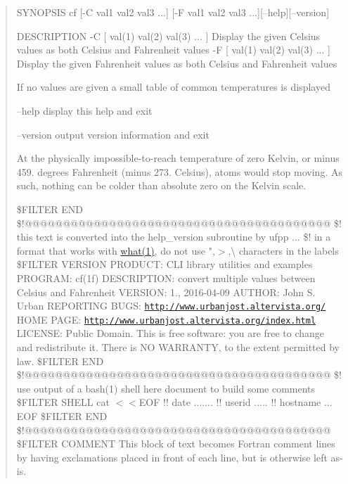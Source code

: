 \begin{quote}
S\+Y\+N\+O\+P\+S\+IS cf \mbox{[}-\/C val1 val2 val3 ...\mbox{]} \mbox{[}-\/F val1 val2 val3 ...\mbox{]}\mbox{[}--help\mbox{]}\mbox{[}--version\mbox{]}

D\+E\+S\+C\+R\+I\+P\+T\+I\+ON -\/C \mbox{[} val(1) val(2) val(3) ... \mbox{]} Display the given Celsius values as both Celsius and Fahrenheit values -\/F \mbox{[} val(1) val(2) val(3) ... \mbox{]} Display the given Fahrenheit values as both Celsius and Fahrenheit values

If no values are given a small table of common temperatures is displayed

--help display this help and exit

--version output version information and exit

At the physically impossible-\/to-\/reach temperature of zero Kelvin, or minus 459. degrees Fahrenheit (minus 273. Celsius), atoms would stop moving. As such, nothing can be colder than absolute zero on the Kelvin scale.

\$\+F\+I\+L\+T\+ER E\+ND \$!@@@@@@@@@@@@@@@@@@@@@@@@@@@@@@@@@@@@@@@@ \$! this text is converted into the help\+\_\+version subroutine by ufpp ... \$! in a format that works with \hyperlink{what__overview_81_8txt_a8cdf8efd1b900d6dce77a3f97edb2216}{what(1)}, do not use ",$>$,\textbackslash{} characters in the labels \$\+F\+I\+L\+T\+ER V\+E\+R\+S\+I\+ON P\+R\+O\+D\+U\+CT\+: C\+LI library utilities and examples P\+R\+O\+G\+R\+AM\+: cf(1f) D\+E\+S\+C\+R\+I\+P\+T\+I\+ON\+: convert multiple values between Celsius and Fahrenheit V\+E\+R\+S\+I\+ON\+: 1., 2016-\/04-\/09 A\+U\+T\+H\+OR\+: John S. Urban R\+E\+P\+O\+R\+T\+I\+NG B\+U\+GS\+: \href{http://www.urbanjost.altervista.org/}{\tt http\+://www.\+urbanjost.\+altervista.\+org/} H\+O\+ME P\+A\+GE\+: \href{http://www.urbanjost.altervista.org/index.html}{\tt http\+://www.\+urbanjost.\+altervista.\+org/index.\+html} L\+I\+C\+E\+N\+SE\+: Public Domain. This is free software\+: you are free to change and redistribute it. There is NO W\+A\+R\+R\+A\+N\+TY, to the extent permitted by law. \$\+F\+I\+L\+T\+ER E\+ND \$!@@@@@@@@@@@@@@@@@@@@@@@@@@@@@@@@@@@@@@@@ \$! use output of a bash(1) shell here document to build some comments \$\+F\+I\+L\+T\+ER S\+H\+E\+LL cat $<$$<$E\+OF !! date .......  !! userid .....  !! hostname ...  E\+OF \$\+F\+I\+L\+T\+ER E\+ND \$!@@@@@@@@@@@@@@@@@@@@@@@@@@@@@@@@@@@@@@@@ \$\+F\+I\+L\+T\+ER C\+O\+M\+M\+E\+NT This block of text becomes Fortran comment lines by having exclamations placed in front of each line, but is otherwise left as-\/is.


\end{quote}
